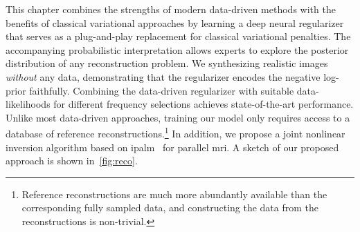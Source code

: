 This chapter combines the strengths of modern data-driven methods with the benefits of classical variational approaches by learning a deep neural regularizer that serves as a plug-and-play replacement for classical variational penalties.
The accompanying probabilistic interpretation allows experts to explore the posterior distribution of any reconstruction problem.
We synthesizing realistic images \emph{without} any data, demonstrating that the regularizer encodes the negative log-prior faithfully.
Combining the data-driven regularizer with suitable data-likelihoods for different frequency selections achieves state-of-the-art performance.
Unlike most data-driven approaches, training our model only requires access to a database of reference reconstructions.\footnote{%
	Reference reconstructions are much more abundantly available than the corresponding fully sampled data, and constructing the data from the reconstructions is non-trivial.
}
In addition, we propose a joint nonlinear inversion algorithm based on \gls{ipalm}~\cite{pock_inertial_2016} for parallel \gls{mri}.
A sketch of our proposed approach is shown in~\cref{fig:reco}.
